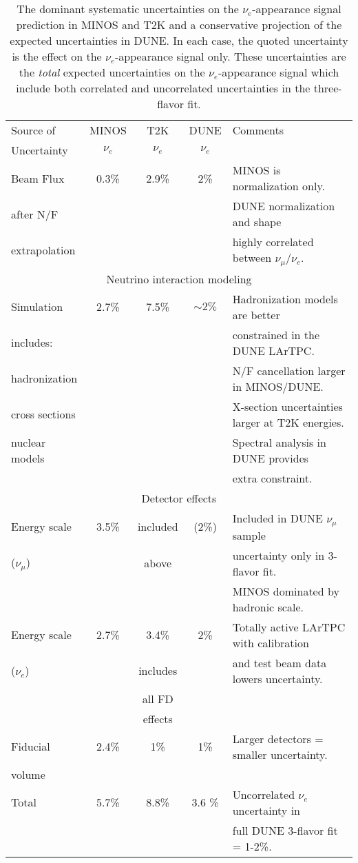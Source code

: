 \begin{table}[!hb]
\begin{center}
  \caption {The dominant systematic uncertainties on the $\nu_e$-appearance 
    signal prediction in MINOS and T2K and a conservative projection of the 
    expected uncertainties in DUNE. In each case, the quoted uncertainty is
    the effect on the $\nu_e$-appearance signal only. These uncertainties 
    are the \emph{total} expected uncertainties on the $\nu_e$-appearance signal 
    which include both correlated and uncorrelated uncertainties in the 
    three-flavor fit.\vspace{2pt}}
\label{tab:nuesysts}
\begin{tabular}{|l|c|c|c|l|} \hline\hline
Source of & MINOS & T2K & DUNE & Comments \\ 
Uncertainty & $\nu_e$ & $\nu_e$ & $\nu_e$ & \\ \hline\hline
Beam Flux & 0.3\% & 2.9\% & 2\% & MINOS is normalization only.\\ 
after N/F & & & & DUNE normalization  and shape   \\
extrapolation & & & & highly correlated between $\nu_\mu/\nu_e$. \\ \hline\hline
\multicolumn{5}{|c|}{Neutrino interaction modeling}  \\ \hline
Simulation & 2.7\% & 7.5\% & $\sim 2\%$ & Hadronization models are better  \\
includes: & & & & constrained in the DUNE LArTPC. \\
hadronization & & & &  N/F cancellation larger in MINOS/DUNE. \\ 
cross sections & & & & X-section uncertainties larger at T2K energies. \\ 
nuclear models & & & & Spectral analysis in DUNE provides \\ 
& & & & extra constraint. \\ \hline\hline
\multicolumn{5}{|c|}{Detector effects}  \\ \hline
Energy scale  & 3.5\% & included& (2\%) & Included in DUNE $\nu_\mu$ sample  \\ 
($\nu_\mu$) & & above & &  uncertainty only in 3-flavor fit. \\
& & & & MINOS dominated by hadronic scale. \\ \hline
Energy  scale & 2.7\% & 3.4\% & 2\% & Totally active LArTPC with calibration \\
($\nu_e$) & & includes & & and test beam data lowers uncertainty. \\
 & & all FD & & \\
 & & effects & & \\ \hline 
Fiducial & 2.4\% & 1\% & 1\% & Larger detectors = smaller uncertainty. \\ 
volume & & & & \\ \hline\hline
Total  & 5.7\% & 8.8\% & 3.6 \% & Uncorrelated $\nu_e$ uncertainty in  \\ 
& & & & full DUNE 3-flavor fit = 1-2\%. \\ \hline\hline
\end{tabular}
\end{center}
\end{table}
